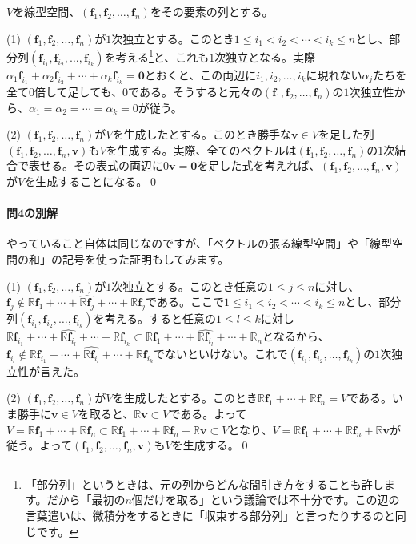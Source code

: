 $V$を線型空間、$(\bm{f}_1, \bm{f}_2, \ldots, \bm{f}_n)$をその要素の列とする。

\noindent (1) $(\bm{f}_1, \bm{f}_2, \ldots, \bm{f}_n)$が$1$次独立とする。このとき$1\leq i_1 < i_2 < \cdots < i_k \leq n$とし、部分列$(\bm{f}_{i_1}, \bm{f}_{i_2}, \ldots, \bm{f}_{i_k})$を考える\footnote{「部分列」というときは、元の列からどんな間引き方をすることも許します。だから「最初の$n$個だけを取る」という議論では不十分です。この辺の言葉遣いは、微積分をするときに「収束する部分列」と言ったりするのと同じです。}と、これも$1$次独立となる。実際$\alpha_1 \bm{f}_{i_1} + \alpha_2 \bm{f}_{i_2} + \cdots  + \alpha_k \bm{f}_{i_k} = \bm{0}$とおくと、この両辺に$i_1, i_2, \ldots, i_k$に現れない$\alpha_j$たちを全て$0$倍して足しても、$0$である。そうすると元々の$(\bm{f}_1, \bm{f}_2, \ldots, \bm{f}_n)$の$1$次独立性から、$\alpha_1 = \alpha_2 = \cdots = \alpha_k = 0$が従う。

\noindent (2) $(\bm{f}_1, \bm{f}_2, \ldots, \bm{f}_n)$が$V$を生成したとする。このとき勝手な$\bm{v} \in V$を足した列$(\bm{f}_1, \bm{f}_2, \ldots, \bm{f}_n, \bm{v})$も$V$を生成する。実際、全てのベクトルは$(\bm{f}_1, \bm{f}_2, \ldots, \bm{f}_n)$の$1$次結合で表せる。その表式の両辺に$0\bm{v} = \bm{0}$を足した式を考えれば、$(\bm{f}_1, \bm{f}_2, \ldots, \bm{f}_n, \bm{v})$が$V$を生成することになる。\qed

\paragraph{問4の別解} やっていること自体は同じなのですが、「ベクトルの張る線型空間」や「線型空間の和」の記号を使った証明もしてみます。

\noindent (1) $(\bm{f}_1, \bm{f}_2, \ldots, \bm{f}_n)$が$1$次独立とする。このとき任意の$1\leq j \leq n$に対し、$\bm{f}_j \not\in \mathbb{R}\bm{f}_1 + \cdots + \hat{\mathbb{R}\bm{f}_j} + \cdots + \mathbb{R}\bm{f}_j$である。ここで$1\leq i_1 < i_2 < \cdots < i_k \leq n$とし、部分列$(\bm{f}_{i_1}, \bm{f}_{i_2}, \ldots, \bm{f}_{i_k})$を考える。すると任意の$1\leq l \leq k$に対し$\mathbb{R}\bm{f}_{i_1} + \cdots + \hat{\mathbb{R}\bm{f}_{i_l}} + \cdots + \mathbb{R}\bm{f}_{i_k}\subset\mathbb{R}\bm{f}_1 + \cdots + \hat{\mathbb{R}\bm{f}_{i_l}} + \cdots + \mathbb{R}_n$となるから、$\bm{f}_{i_l} \not\in \mathbb{R}\bm{f}_{i_1} + \cdots + \hat{\mathbb{R}\bm{f}_{i_l}} + \cdots + \mathbb{R}\bm{f}_{i_k}$でないといけない。これで$(\bm{f}_{i_1}, \bm{f}_{i_2}, \ldots, \bm{f}_{i_k})$の$1$次独立性が言えた。

\noindent (2) $(\bm{f}_1, \bm{f}_2, \ldots, \bm{f}_n)$が$V$を生成したとする。このとき$\mathbb{R}\bm{f}_1 + \cdots + \mathbb{R}\bm{f}_n = V$である。いま勝手に$\bm{v} \in V$を取ると、$\mathbb{R}\bm{v} \subset V$である。よって$V = \mathbb{R}\bm{f}_1 + \cdots + \mathbb{R}\bm{f}_n \subset \mathbb{R}\bm{f}_1 + \cdots + \mathbb{R}\bm{f}_n + \mathbb{R}\bm{v} \subset V$となり、$V = \mathbb{R}\bm{f}_1 + \cdots + \mathbb{R}\bm{f}_n + \mathbb{R}\bm{v}$が従う。よって$(\bm{f}_1, \bm{f}_2, \ldots, \bm{f}_n, \bm{v})$も$V$を生成する。\qed

